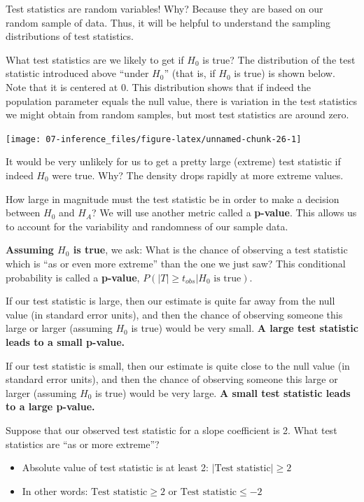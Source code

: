 \documentclass[
]{book}
\providecommand{\tightlist}{%
  \setlength{\itemsep}{0pt}\setlength{\parskip}{0pt}}
\begin{document}
Test statistics are random variables! Why? Because they are based on our random sample of data. Thus, it will be helpful to understand the sampling distributions of test statistics.

What test statistics are we likely to get if \(H_0\) is true? The distribution of the test statistic introduced above ``under \(H_0\)'' (that is, if \(H_0\) is true) is shown below. Note that it is centered at 0. This distribution shows that if indeed the population parameter equals the null value, there is variation in the test statistics we might obtain from random samples, but most test statistics are around zero.

\begin{center}\texttt{[image: 07-inference\_files/figure-latex/unnamed-chunk-26-1]} \end{center}

It would be very unlikely for us to get a pretty large (extreme) test statistic if indeed \(H_0\) were true. Why? The density drops rapidly at more extreme values.

How large in magnitude must the test statistic be in order to make a decision between \(H_0\) and \(H_A\)? We will use another metric called a \textbf{p-value}. This allows us to account for the variability and randomness of our sample data.

\textbf{Assuming \(H_0\) is true}, we ask: What is the chance of observing a test statistic which is ``as or even more extreme'' than the one we just saw? This conditional probability is called a \textbf{p-value}, \(P(|T| \geq t_{obs} | H_0\text{ is true})\).

If our test statistic is large, then our estimate is quite far away from the null value (in standard error units), and then the chance of observing someone this large or larger (assuming \(H_0\) is true) would be very small. \textbf{A large test statistic leads to a small p-value.}

If our test statistic is small, then our estimate is quite close to the null value (in standard error units), and then the chance of observing someone this large or larger (assuming \(H_0\) is true) would be very large. \textbf{A small test statistic leads to a large p-value.}

Suppose that our observed test statistic for a slope coefficient is 2. What test statistics are ``as or more extreme''?

\begin{itemize}
\tightlist
\item
  Absolute value of test statistic is at least 2: \(|\text{Test statistic}| \geq 2\)
\item
  In other words: \(\text{Test statistic} \geq 2\) or \(\text{Test statistic} \leq -2\)
\end{itemize}
\end{document}
